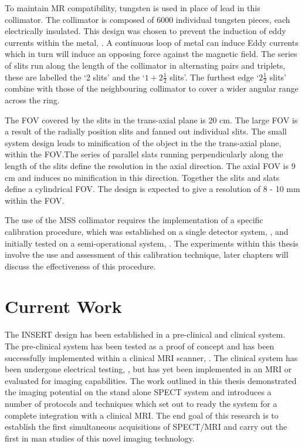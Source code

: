 To maintain \acrshort{MR} compatibility, tungsten is used in place of lead in this collimator. The collimator is composed of 6000 individual tungsten pieces, each electrically insulated. This design was chosen to prevent the induction of eddy currents within the metal, \cite{7286864}. A continuous loop of metal can induce Eddy currents which in turn will induce an opposing force against the magnetic field. The series of slits run along the length of the collimator in alternating pairs and triplets, these are labelled the `2 slits' and the `$1 + 2\frac{1}{2}$ slits'. The furthest edge `$2\frac{1}{2}$ slits'  combine with those of the neighbouring collimator to cover a wider angular range across the ring. 

The \acrshort{FOV} covered by the slits in the trans-axial plane is 20 cm. The large \acrshort{FOV} is a result of the radially position slits and fanned out individual slits. The small system design leads to minification of the object in the the trans-axial plane, within the \acrshort{FOV}.The series of parallel slats running perpendicularly along the length of the slits define the resolution in the axial direction. The axial \acrshort{FOV} is 9 cm and induces no minification in this direction. Together the slits and slats define a cylindrical \acrlong{FOV}. The design is expected to give a resolution of 8 - 10 mm within the \acrshort{FOV}. 

 The use of the MSS collimator requires the implementation of a specific calibration procedure, which was established on a single detector system, \cite{8340862}, and initially tested on a semi-operational system, \cite{inproceedings}. The experiments within this thesis involve the use and assessment of this calibration technique, later chapters will discuss the effectiveness of this procedure.

\section{Current Work}

The \acrshort{INSERT} design has been established in a pre-clinical and clinical system. The pre-clinical system has been tested as a proof of concept and has been successfully implemented within a clinical \acrshort{MRI} scanner, \cite{insertpreclin}. The clinical system has been undergone electrical testing, \cite{marco}, but has yet been implemented in an \acrshort{MRI} or evaluated for imaging capabilities. The work outlined in this thesis demonstrated the imaging potential on the stand alone \acrshort{SPECT} system and introduces a number of protocols and techniques which set out to ready the system for a complete integration with a clinical \acrshort{MRI}. The end goal of this research is to establish the first simultaneous acquisitions of \acrshort{SPECT/MRI} and carry out the first in man studies of this novel imaging technology. 
















